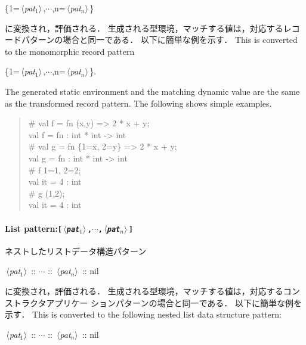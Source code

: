 \documentclass{jbook}
\newcommand{\txt}[2]{#2}
\newcommand{\nonterm}[1]{\mbox{$\,\langle$}{\it #1}\mbox{$\rangle\,$}}
\newcommand{\term}[1]{\mbox{{\tt #1}}}
\newenvironment{program}{\begin{quote}\begin{tt}}%
                        {\end{tt}\end{quote}}
\begin{document}
\begin{center}
\{1=\nonterm{pat$_1$},$\cdots$,n=\nonterm{pat$_n$}\}
\end{center}

に変換され，評価される．
	生成される型環境，マッチする値は，対応するレコードパターンの場合と同一である．
	以下に簡単な例を示す．
\else%
	This is converted to the monomorphic record pattern
\begin{center}
\{1=\nonterm{pat$_1$},$\cdots$,n=\nonterm{pat$_n$}\}.
\end{center}
	The generated static environment and the matching dynamic value
are the same as the transformed record pattern.
	The following shows simple examples.
\fi%
	
\begin{program}
\# val f = fn (x,y) => 2 * x + y;
\\
val f = fn : int * int -> int
\\
\# val g = fn \{1=x, 2=y\} => 2 * x + y;
\\
val g = fn : int * int -> int
\\
\# f {1=1, 2=2};
\\
val it = 4 : int
\\
\# g (1,2);
\\
val it = 4 : int
\end{program}

\paragraph{\txt{リストパターン}{List pattern}:\term{[\nonterm{pat$_1$},$\cdots$,\nonterm{pat$_n$}]}}
\ifjp%
	ネストしたリストデータ構造パターン

\begin{center}
\nonterm{pat$_1$} :: $\cdots$ :: \nonterm{pat$_n$} :: nil
\end{center}

に変換され，評価される．
	生成される型環境，マッチする値は，対応するコンストラクタアプリケー
ションパターンの場合と同一である．
	以下に簡単な例を示す．
\else%
	This is converted to the following nested list data structure
pattern:

\begin{center}
\nonterm{pat$_1$} :: $\cdots$ :: \nonterm{pat$_n$} :: nil
\end{center}
\end{document}
